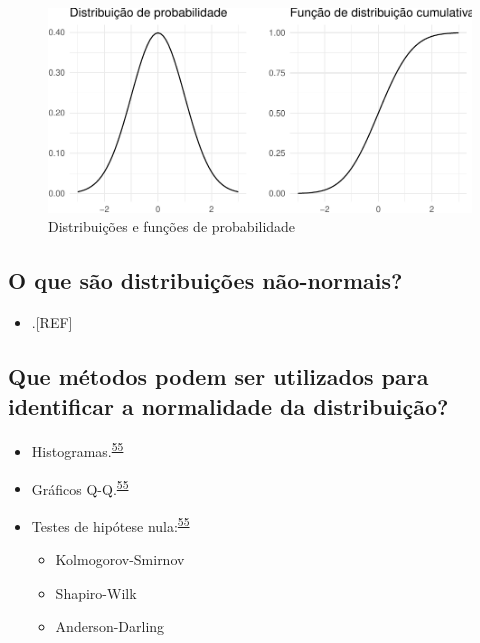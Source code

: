 \documentclass[
  a4paper,
]{book}
\providecommand{\tightlist}{%
  \setlength{\itemsep}{0pt}\setlength{\parskip}{0pt}}
\begin{document}
\begin{figure}

{\centering \includegraphics{Ciencia-com-R_files/figure-latex/distribuicao-normal-1} 

}

\caption{Distribuições e funções de probabilidade}\label{fig:distribuicao-normal}
\end{figure}

\hypertarget{o-que-suxe3o-distribuiuxe7uxf5es-nuxe3o-normais}{%
\subsection{O que são distribuições não-normais?}\label{o-que-suxe3o-distribuiuxe7uxf5es-nuxe3o-normais}}

\begin{itemize}
\tightlist
\item
  .{[}REF{]}
\end{itemize}

\hypertarget{que-muxe9todos-podem-ser-utilizados-para-identificar-a-normalidade-da-distribuiuxe7uxe3o}{%
\subsection{Que métodos podem ser utilizados para identificar a normalidade da distribuição?}\label{que-muxe9todos-podem-ser-utilizados-para-identificar-a-normalidade-da-distribuiuxe7uxe3o}}

\begin{itemize}
\item
  Histogramas.\textsuperscript{\protect\hyperlink{ref-vetter2017}{55}}
\item
  Gráficos Q-Q.\textsuperscript{\protect\hyperlink{ref-vetter2017}{55}}
\item
  Testes de hipótese nula:\textsuperscript{\protect\hyperlink{ref-vetter2017}{55}}

  \begin{itemize}
  \item
    Kolmogorov-Smirnov
  \item
    Shapiro-Wilk
  \item
    Anderson-Darling
  \end{itemize}
\end{itemize}
\end{document}
